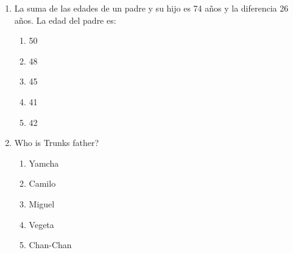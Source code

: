 \documentclass[letterpaper,addpoints,answers,twocolumn,10pt]{exam}
\begin{document}
\begin{enumerate}[leftmargin=.2in]
\begin{enumerate}[noitemsep,leftmargin=0in]
\end{enumerate}



\item  La suma de las edades de un padre y su hijo es 74 años y la diferencia 26 años. La edad del padre es:


\begin{enumerate}[noitemsep,leftmargin=0in]


\item  50
\item  48
\item  45
\item  41
\item  42


\end{enumerate}



\item  Who is Trunks father?


\begin{enumerate}[noitemsep,leftmargin=0in]


\item  Yamcha
\item  Camilo
\item  Miguel
\item  Vegeta
\item  Chan-Chan


\end{enumerate}



\end{enumerate}
\end{document}
